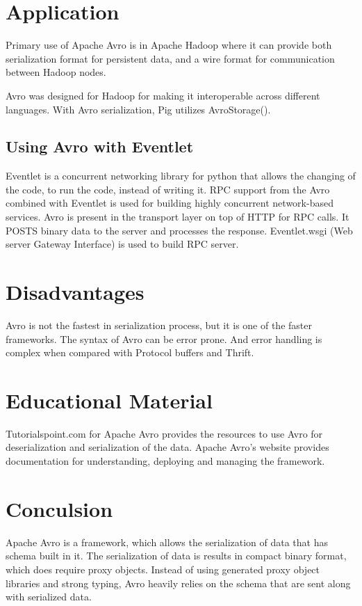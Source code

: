 \documentclass[9pt,twocolumn,twoside]{../../styles/osajnl}
\begin{document}


\section{Application}

Primary use of Apache Avro is in Apache Hadoop where it can provide
both serialization format for persistent data, and a wire format for
communication between Hadoop nodes.

Avro was designed for Hadoop for making it interoperable across
different languages.  With Avro serialization, Pig utilizes
AvroStorage().

\subsection{Using Avro with Eventlet}

Eventlet\cite{www-using-avro} is a concurrent networking library for
python that allows the changing of the code, to run the code, instead
of writing it.  RPC support from the Avro combined with Eventlet is
used for building highly concurrent network-based services. Avro is
present in the transport layer on top of HTTP for RPC calls. It POSTS
binary data to the server and processes the response. Eventlet.wsgi
(Web server Gateway Interface) is used to build RPC server.

\section{Disadvantages}

Avro is not the fastest in serialization process, but it is one of the
faster frameworks.  The syntax of Avro can be error prone. And error
handling is complex when compared with Protocol buffers and Thrift.



\section{Educational Material}

Tutorialspoint.com \cite{www-tutorialspoint-avro}for Apache Avro
provides the resources to use Avro for deserialization and
serialization of the data.  Apache Avro’s \cite{www-apache-avro}
website provides documentation for understanding, deploying and
managing the framework.

\section{Conculsion}

Apache Avro is a framework, which allows the serialization of data
that has schema built in it. The serialization of data is results in
compact binary format, which does require proxy objects. Instead of
using generated proxy object libraries and strong typing, Avro heavily
relies on the schema that are sent along with serialized data.


\end{document}
